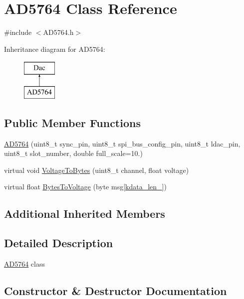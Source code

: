 \hypertarget{classAD5764}{}\section{A\+D5764 Class Reference}
\label{classAD5764}


{\ttfamily \#include $<$A\+D5764.\+h$>$}

Inheritance diagram for A\+D5764\+:\begin{figure}[H]
\begin{center}
\leavevmode
\includegraphics[height=2.000000cm]{classAD5764}
\end{center}
\end{figure}
\subsection*{Public Member Functions}
\begin{DoxyCompactItemize}
\item 
\mbox{\hyperlink{classAD5764_a3a5228318a1962905e7748f62269bc26}{A\+D5764}} (uint8\+\_\+t sync\+\_\+pin, uint8\+\_\+t spi\+\_\+bus\+\_\+config\+\_\+pin, uint8\+\_\+t ldac\+\_\+pin, uint8\+\_\+t slot\+\_\+number, double full\+\_\+scale=10.)
\item 
virtual void \mbox{\hyperlink{classAD5764_a85fac1341f18b4a7014da415b421cd03}{Voltage\+To\+Bytes}} (uint8\+\_\+t channel, float voltage)
\item 
virtual float \mbox{\hyperlink{classAD5764_a8f2845c7dd6b8984e7b85c35e50bbb66}{Bytes\+To\+Voltage}} (byte msg\mbox{[}\mbox{\hyperlink{classDac_af3de0bf669183e66ebf916f8c685fe6b}{kdata\+\_\+len\+\_\+}}\mbox{]})
\end{DoxyCompactItemize}
\subsection*{Additional Inherited Members}


\subsection{Detailed Description}
\mbox{\hyperlink{classAD5764}{A\+D5764}} class 

\subsection{Constructor \& Destructor Documentation}
\mbox{\label{classAD5764_a3a5228318a1962905e7748f62269bc26}} 
